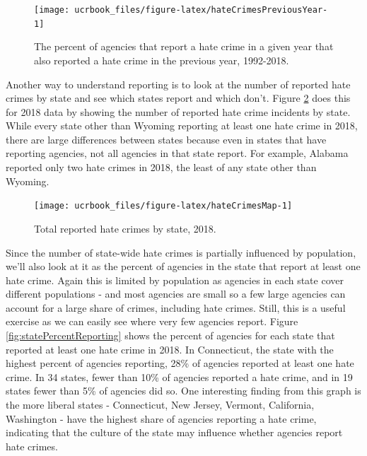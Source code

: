 \documentclass[
  12pt,
  openany]{book}
\begin{document}
\begin{figure}

{\centering \texttt{[image: ucrbook\_files/figure-latex/hateCrimesPreviousYear-1]} 

}

\caption{The percent of agencies that report a hate crime in a given year that also reported a hate crime in the previous year, 1992-2018.}\label{fig:hateCrimesPreviousYear}
\end{figure}

Another way to understand reporting is to look at the number of reported hate crimes by state and see which states report and which don't. Figure \ref{fig:hateCrimesMap} does this for 2018 data by showing the number of reported hate crime incidents by state. While every state other than Wyoming reporting at least one hate crime in 2018, there are large differences between states because even in states that have reporting agencies, not all agencies in that state report. For example, Alabama reported only two hate crimes in 2018, the least of any state other than Wyoming.

\begin{figure}

{\centering \texttt{[image: ucrbook\_files/figure-latex/hateCrimesMap-1]} 

}

\caption{Total reported hate crimes by state, 2018.}\label{fig:hateCrimesMap}
\end{figure}

Since the number of state-wide hate crimes is partially influenced by population, we'll also look at it as the percent of agencies in the state that report at least one hate crime. Again this is limited by population as agencies in each state cover different populations - and most agencies are small so a few large agencies can account for a large share of crimes, including hate crimes. Still, this is a useful exercise as we can easily see where very few agencies report. Figure \ref{fig:statePercentReporting} shows the percent of agencies for each state that reported at least one hate crime in 2018. In Connecticut, the state with the highest percent of agencies reporting, 28\% of agencies reported at least one hate crime. In 34 states, fewer than 10\% of agencies reported a hate crime, and in 19 states fewer than 5\% of agencies did so. One interesting finding from this graph is the more liberal states - Connecticut, New Jersey, Vermont, California, Washington - have the highest share of agencies reporting a hate crime, indicating that the culture of the state may influence whether agencies report hate crimes.
\end{document}
